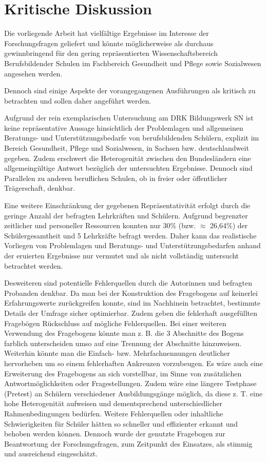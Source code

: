 \section{Kritische Diskussion}
\label{sec:KritischeDiskussion}

Die vorliegende Arbeit hat vielfältige Ergebnisse im Interesse der Forschungsfragen geliefert und könnte möglicherweise als durchaus gewinnbringend für den gering repräsentierten Wissenschaftsbereich Berufsbildender Schulen im Fachbereich Gesundheit und Pflege sowie Sozialwesen angesehen werden.

Dennoch sind einige Aspekte der vorangegangenen Ausführungen als kritisch zu betrachten und sollen daher angeführt werden.

Aufgrund der rein exemplarischen Untersuchung am DRK Bildungswerk SN ist keine repräsentative Aussage hinsichtlich der Problemlagen und allgemeinen Beratungs- und Unterstützungsbedarfe von berufsbildenden Schülern, explizit im Bereich Gesundheit, Pflege und Sozialwesen, in Sachsen bzw. deutschlandweit gegeben. Zudem erschwert die Heterogenität zwischen den Bundesländern eine allgemeingültige Antwort bezüglich der untersuchten Ergebnisse. Dennoch sind Parallelen zu anderen beruflichen Schulen, ob in freier oder öffentlicher Trägerschaft, denkbar.

Eine weitere Einschränkung der gegebenen Repräsentativität erfolgt durch die geringe Anzahl der befragten Lehrkräften und Schülern. Aufgrund begrenzter zeitlicher und personeller Ressourcen konnten nur 30\% (bzw. $\approx$ 26,64\%) der Schülergesamtheit und 5 Lehrkräfte befragt werden. Daher kann das realistische Vorliegen von Problemlagen und Beratungs- und Unterstützungsbedarfen anhand der eruierten Ergebnisse nur vermutet und als nicht vollständig untersucht betrachtet werden. 

Desweiteren sind potentielle Fehlerquellen durch die Autorinnen und befragten Probanden denkbar. Da man bei der Konstruktion des Fragebogens auf keinerlei Erfahrungswerte zurückgreifen konnte, sind im Nachhinein betrachtet, bestimmte Details der Umfrage sicher optimierbar. Zudem geben die fehlerhaft ausgefüllten Fragebögen Rückschluss auf mögliche Fehlerquellen. Bei einer weiteren Verwendung des Fragebogens könnte man z. B. die 3 Abschnitte des Bogens farblich unterscheiden umso auf eine Trennung der Abschnitte hinzuweisen. Weiterhin könnte man die Einfach- bzw. Mehrfachnennungen deutlicher hervorheben um so einem fehlerhaften Ankreuzen vorzubeugen. Es wäre auch eine Erweiterung des Fragebogens an sich vorstellbar, im Sinne von zusätzlichen Antwortmöglichkeiten oder Fragestellungen. Zudem wäre eine längere Testphase (Pretest) an Schülern verschiedener Ausbildungsgänge möglich, da diese z. T. eine hohe Heterogenität aufweisen und dementsprechend unterschiedlicher Rahmenbedingungen bedürfen. Weitere Fehlerquellen oder inhaltliche Schwierigkeiten für Schüler hätten so schneller und effizienter erkannt und behoben werden können. Dennoch wurde der genutzte Fragebogen zur Beantwortung der Forschungsfragen, zum Zeitpunkt des Einsatzes, als stimmig und ausreichend eingeschätzt.

